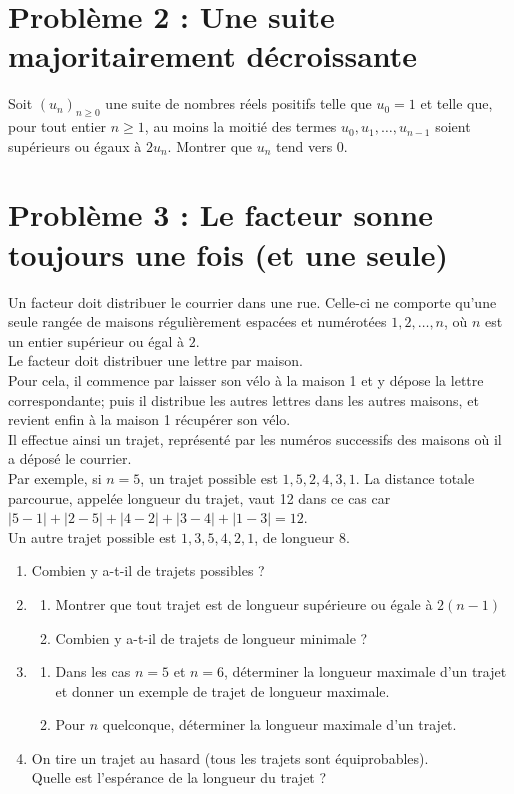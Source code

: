 \documentclass[landscape,twocolumn,leqno,a4paper,10pt]{report} %
\newcommand\n{\noindent}
\renewcommand{\geq}{\geqslant}
\begin{document}
\section{Problème 2 : Une suite majoritairement décroissante}

\n Soit $\left(u_{n}\right)_{n \geq 0}$ une suite de nombres réels positifs telle que $u_{0}=1$ et telle que, pour tout entier $n \geq 1$, au moins la moitié des termes $u_{0}, u_{1}, \ldots, u_{n-1}$ soient supérieurs ou égaux à $2 u_{n}$. Montrer que $u_{n}$ tend vers 0.

\section{Problème 3 : Le facteur sonne toujours une fois (et une seule)}

\n Un facteur doit distribuer le courrier dans une rue. Celle-ci ne comporte qu'une seule rangée de maisons régulièrement espacées et numérotées $1,2, \ldots, n$, où $n$ est un entier supérieur ou égal à $2$.\\
Le facteur doit distribuer une lettre par maison.\\
Pour cela, il commence par laisser son vélo à la maison 1 et y dépose la lettre correspondante; puis il distribue les autres lettres dans les autres maisons, et revient enfin à la maison 1 récupérer son vélo.\\
Il effectue ainsi un trajet, représenté par les numéros successifs des maisons où il a déposé le courrier.\\
Par exemple, si $n=5$, un trajet possible est $1,5,2,4,3,1$. La distance totale parcourue, appelée longueur du trajet, vaut 12 dans ce cas car $|5-1|+|2-5|+|4-2|+|3-4|+|1-3|=12$.\\
Un autre trajet possible est $1,3,5,4,2,1$, de longueur $8$.

\begin{enumerate}
	\item Combien y a-t-il de trajets possibles ?
	\item \begin{enumerate}
		\item Montrer que tout trajet est de longueur supérieure ou égale à $2(n-1)$
		\item Combien y a-t-il de trajets de longueur minimale ?
	\end{enumerate}
	\item \begin{enumerate}
		\item Dans les cas $n=5$ et $n=6$, déterminer la longueur maximale d'un trajet et donner un exemple de trajet de longueur maximale.
		\item Pour $n$ quelconque, déterminer la longueur maximale d'un trajet.
	\end{enumerate}
	\item On tire un trajet au hasard (tous les trajets sont équiprobables).\\
	Quelle est l'espérance de la longueur du trajet ?
\end{enumerate}
\end{document}

